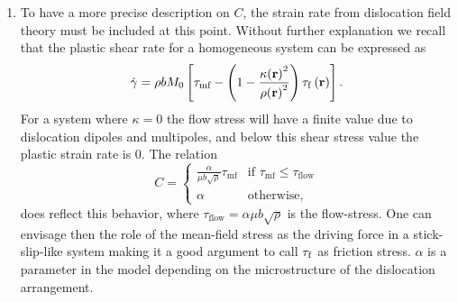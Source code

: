 \begin{enumerate}
\item To have a more precise description on $C$, the strain rate from dislocation field theory must be included at this point. Without further explanation we recall \cite{gromaCISM} that the plastic shear rate for a homogeneous system can be expressed as 
\begin{equation}
\dot \gamma  = \rho b{M_0}\left[ {{\tau _{{\text{mf}}}} - \left( {1 - \frac{{\kappa {{\left( {\mathbf{r}} \right)}^2}}}{{\rho {{\left( {\mathbf{r}} \right)}^2}}}} \right){\tau _{\rm{f}}}\left( {\mathbf{r}} \right)} \right].
\end{equation}
For a system where $\kappa = 0$ the flow stress will have a finite value due to dislocation dipoles and multipoles, and below this shear stress value the plastic strain rate is 0. The relation
\begin{equation} \label{eq:friction_stress_coeff}
C = \left\{
  \begin{array}{lr}
    \frac{\alpha }{\mu b \sqrt \rho  } \tau_{\text{mf}} & {\text{if }}{\tau _{{\text{mf}}}} \leqslant {\tau _{\text{flow}}} \\ 
  \alpha \quad  & {\text{otherwise,}}
  \end{array}
\right.
\end{equation}
does reflect this behavior, where ${\tau _{{\text{flow}}}} = \alpha \mu b\sqrt \rho  $ is the flow-stress. One can envisage then the role of the mean-field stress as the driving force in a stick-slip-like system making it a good argument to call ${{\tau _{\rm{f}}}}$ as friction stress. $\alpha$ is a parameter in the model depending on the microstructure of the dislocation arrangement.


\end{enumerate}
